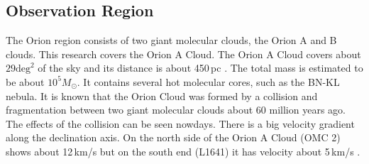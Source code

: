 \documentclass[twoside,11pt]{gshs_thesis}
\begin{document}
\subsection{Observation Region}
The Orion region consists of two giant molecular clouds, the Orion A and B clouds. This research covers the Orion A Cloud. The Orion A Cloud covers about $29 \textrm{deg}^2$ of the sky and its distance is about 450$\,$pc \cite{Oriondistance}. The total mass is estimated to be about $10^5 M_{\odot}$. It contains several hot molecular cores, such as the BN-KL nebula. It is known that the Orion Cloud was formed by a collision and fragmentation between two giant molecular clouds about 60 million years ago. The effects of the collision can be seen nowdays. There is a big velocity gradient along the declination axis. On the north side of the Orion A Cloud (OMC 2) shows about 12$\,$km/s but on the south end (L1641) it has velocity about 5$\,$km/s \cite{Schulz}.
\end{document}
